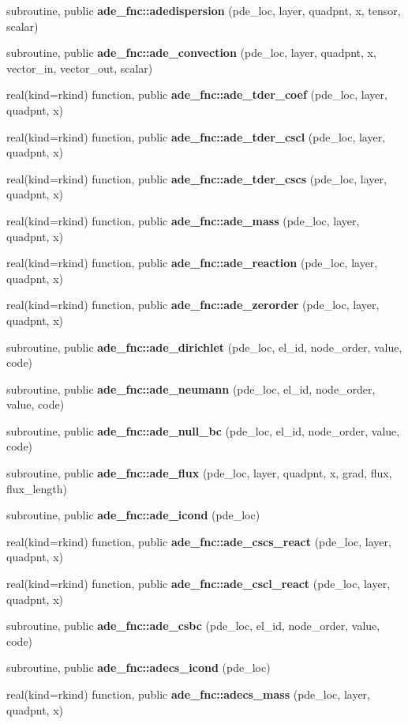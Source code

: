\begin{DoxyCompactItemize}
\item 
subroutine, public {\bf ade\+\_\+fnc\+::adedispersion} (pde\+\_\+loc, layer, quadpnt, x, tensor, scalar)
\item 
subroutine, public {\bf ade\+\_\+fnc\+::ade\+\_\+convection} (pde\+\_\+loc, layer, quadpnt, x, vector\+\_\+in, vector\+\_\+out, scalar)
\item 
real(kind=rkind) function, public {\bf ade\+\_\+fnc\+::ade\+\_\+tder\+\_\+coef} (pde\+\_\+loc, layer, quadpnt, x)
\item 
real(kind=rkind) function, public {\bf ade\+\_\+fnc\+::ade\+\_\+tder\+\_\+cscl} (pde\+\_\+loc, layer, quadpnt, x)
\item 
real(kind=rkind) function, public {\bf ade\+\_\+fnc\+::ade\+\_\+tder\+\_\+cscs} (pde\+\_\+loc, layer, quadpnt, x)
\item 
real(kind=rkind) function, public {\bf ade\+\_\+fnc\+::ade\+\_\+mass} (pde\+\_\+loc, layer, quadpnt, x)
\item 
real(kind=rkind) function, public {\bf ade\+\_\+fnc\+::ade\+\_\+reaction} (pde\+\_\+loc, layer, quadpnt, x)
\item 
real(kind=rkind) function, public {\bf ade\+\_\+fnc\+::ade\+\_\+zerorder} (pde\+\_\+loc, layer, quadpnt, x)
\item 
subroutine, public {\bf ade\+\_\+fnc\+::ade\+\_\+dirichlet} (pde\+\_\+loc, el\+\_\+id, node\+\_\+order, value, code)
\item 
subroutine, public {\bf ade\+\_\+fnc\+::ade\+\_\+neumann} (pde\+\_\+loc, el\+\_\+id, node\+\_\+order, value, code)
\item 
subroutine, public {\bf ade\+\_\+fnc\+::ade\+\_\+null\+\_\+bc} (pde\+\_\+loc, el\+\_\+id, node\+\_\+order, value, code)
\item 
subroutine, public {\bf ade\+\_\+fnc\+::ade\+\_\+flux} (pde\+\_\+loc, layer, quadpnt, x, grad, flux, flux\+\_\+length)
\item 
subroutine, public {\bf ade\+\_\+fnc\+::ade\+\_\+icond} (pde\+\_\+loc)
\item 
real(kind=rkind) function, public {\bf ade\+\_\+fnc\+::ade\+\_\+cscs\+\_\+react} (pde\+\_\+loc, layer, quadpnt, x)
\item 
real(kind=rkind) function, public {\bf ade\+\_\+fnc\+::ade\+\_\+cscl\+\_\+react} (pde\+\_\+loc, layer, quadpnt, x)
\item 
subroutine, public {\bf ade\+\_\+fnc\+::ade\+\_\+csbc} (pde\+\_\+loc, el\+\_\+id, node\+\_\+order, value, code)
\item 
subroutine, public {\bf ade\+\_\+fnc\+::adecs\+\_\+icond} (pde\+\_\+loc)
\item 
real(kind=rkind) function, public {\bf ade\+\_\+fnc\+::adecs\+\_\+mass} (pde\+\_\+loc, layer, quadpnt, x)
\end{DoxyCompactItemize}
